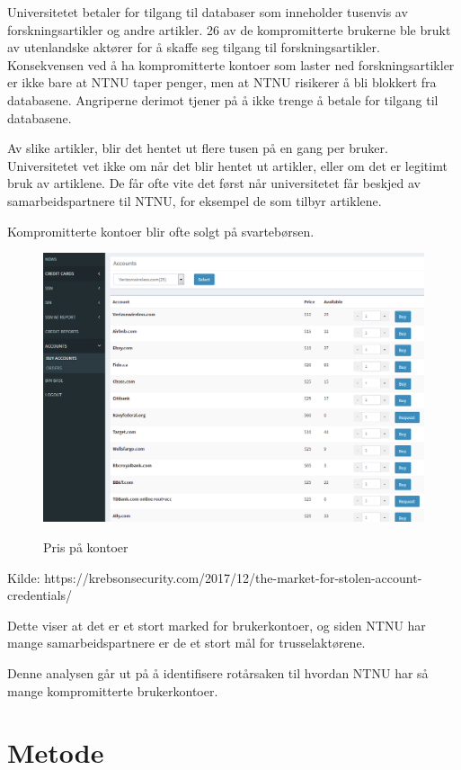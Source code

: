 Universitetet betaler for tilgang til databaser som inneholder tusenvis av forskningsartikler og andre artikler. 26 av de kompromitterte brukerne ble brukt av utenlandske aktører for å skaffe seg tilgang til forskningsartikler. Konsekvensen ved å ha kompromitterte kontoer som laster ned forskningsartikler er ikke bare at NTNU taper penger, men at NTNU risikerer å bli blokkert fra databasene. Angriperne derimot tjener på å ikke trenge å betale for tilgang til databasene. 

Av slike artikler, blir det hentet ut flere tusen på en gang per bruker. Universitetet vet ikke om når det blir hentet ut artikler, eller om det er legitimt bruk av artiklene. De får ofte vite det først når universitetet får beskjed av samarbeidspartnere til NTNU, for eksempel de som tilbyr artiklene. 


Kompromitterte kontoer blir ofte solgt på svartebørsen. 
\begin{figure}[H]
    \centering
    \includegraphics[scale=0.4]{case_2/bilder/prislite_kontore.png}
    \label{fig:kjkk}
    \caption[pris_kontoer]{Pris på kontoer}
\end{figure}
Kilde: https://krebsonsecurity.com/2017/12/the-market-for-stolen-account-credentials/


Dette viser at det er et stort marked for brukerkontoer, og siden NTNU har mange samarbeidspartnere er de et stort mål for trusselaktørene. 


Denne analysen går ut på å identifisere rotårsaken til hvordan NTNU har så mange kompromitterte brukerkontoer.


\section{Metode}

